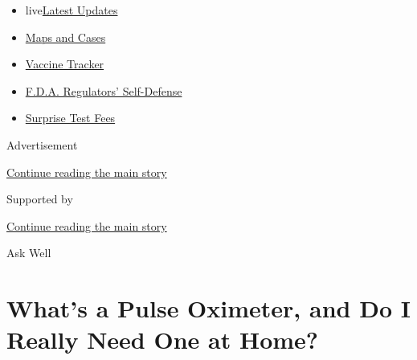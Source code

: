 \begin{itemize}
\tightlist
\item
  live\href{https://www.nytimes3xbfgragh.onion/2020/09/11/world/covid-19-coronavirus.html?name=styln-coronavirus-national\&region=TOP_BANNER\&block=storyline_menu_recirc\&action=click\&pgtype=Article\&impression_id=85d5cd51-f4b9-11ea-a9ee-334f178d1f9e\&variant=undefined}{Latest
  Updates}
\item
  \href{https://www.nytimes3xbfgragh.onion/interactive/2020/us/coronavirus-us-cases.html?name=styln-coronavirus-national\&region=TOP_BANNER\&block=storyline_menu_recirc\&action=click\&pgtype=Article\&impression_id=85d5cd52-f4b9-11ea-a9ee-334f178d1f9e\&variant=undefined}{Maps
  and Cases}
\item
  \href{https://www.nytimes3xbfgragh.onion/interactive/2020/science/coronavirus-vaccine-tracker.html?name=styln-coronavirus-national\&region=TOP_BANNER\&block=storyline_menu_recirc\&action=click\&pgtype=Article\&impression_id=85d5f460-f4b9-11ea-a9ee-334f178d1f9e\&variant=undefined}{Vaccine
  Tracker}
\item
  \href{https://www.nytimes3xbfgragh.onion/2020/09/10/us/politics/fda-coronavirus-vaccine.html?name=styln-coronavirus-national\&region=TOP_BANNER\&block=storyline_menu_recirc\&action=click\&pgtype=Article\&impression_id=85d5f461-f4b9-11ea-a9ee-334f178d1f9e\&variant=undefined}{F.D.A.
  Regulators' Self-Defense}
\item
  \href{https://www.nytimes3xbfgragh.onion/2020/09/09/upshot/coronavirus-surprise-test-fees.html?name=styln-coronavirus-national\&region=TOP_BANNER\&block=storyline_menu_recirc\&action=click\&pgtype=Article\&impression_id=85d5f462-f4b9-11ea-a9ee-334f178d1f9e\&variant=undefined}{Surprise
  Test Fees}
\end{itemize}

Advertisement

\protect\hyperlink{after-top}{Continue reading the main story}

Supported by

\protect\hyperlink{after-sponsor}{Continue reading the main story}

Ask Well

\hypertarget{whats-a-pulse-oximeter-and-do-i-really-need-one-at-home}{%
\section{What's a Pulse Oximeter, and Do I Really Need One at
Home?}\label{whats-a-pulse-oximeter-and-do-i-really-need-one-at-home}}

